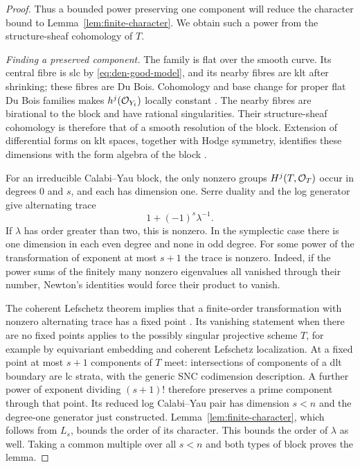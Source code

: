 \begin{proof}
Thus a bounded power preserving one component will reduce the
character bound to Lemma~\ref{lem:finite-character}. We obtain
such a power from the structure-sheaf cohomology of $T$.

\smallskip\noindent\textit{Finding a preserved component.}
The family is flat over the smooth curve.  Its central fibre is slc
by \eqref{eq:den-good-model}, and its nearby fibres are klt after
shrinking; these fibres are Du Bois.  Cohomology and base change for
proper flat Du Bois families makes $h^j(\mathcal O_{Y_t})$ locally
constant \cite[Corollary~2.64]{KollarFamilies2023}.  The nearby fibres are
birational to the block and have rational singularities.  Their
structure-sheaf cohomology is therefore that of a smooth resolution
of the block.  Extension of differential forms on klt spaces,
together with Hodge symmetry, identifies these dimensions with the
form algebra of the block \cite{GKKP2011}.

For an irreducible Calabi--Yau block, the only nonzero groups
$H^j(T,\mathcal O_T)$ occur in degrees $0$ and $s$, and each has
dimension one.  Serre duality and the log generator give alternating
trace
\[
 1+(-1)^s\lambda^{-1}.
\]
If $\lambda$ has order greater than two, this is nonzero.  In the
symplectic case there is one dimension in each even degree and none
in odd degree.  For some power of the transformation of exponent at
most $s+1$ the trace is nonzero.  Indeed, if the power sums of the
finitely many nonzero eigenvalues all vanished through their number,
Newton's identities would force their product to vanish.

The coherent Lefschetz theorem implies that a finite-order
transformation with nonzero alternating trace has a fixed point
\cite{Donovan1969}.  Its vanishing statement when there are no fixed
points applies to the possibly singular projective scheme $T$, for
example by equivariant embedding and coherent Lefschetz localization.
At a fixed point at most $s+1$ components of $T$ meet: intersections
of components of a dlt boundary are lc strata, with the generic SNC
codimension description.  A further power of exponent dividing
$(s+1)!$ therefore preserves a prime component through that point.
Its reduced log Calabi--Yau pair has dimension $s<n$ and the
degree-one generator just constructed.  Lemma~\ref{lem:finite-character},
which follows from $L_s$, bounds the order of its character.
This bounds the order of $\lambda$ as well.  Taking a common
multiple over all $s<n$ and both types of block proves the lemma.
\end{proof}


